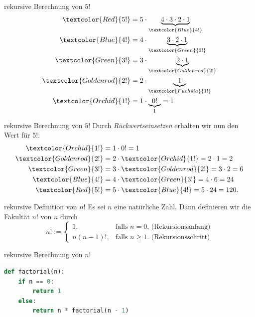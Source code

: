 \begin{frame}[fragile]{rekursive Berechnung von $5!$}
\begin{align*}
    \textcolor{Red}{5!} &= 5\cdot\underbrace{4\cdot 3\cdot 2\cdot 1}_{\textcolor{Blue}{4!}} \\
    \textcolor{Blue}{4!} &= 4\cdot\underbrace{3\cdot 2\cdot 1}_{\textcolor{Green}{3!}} \\
    \textcolor{Green}{3!} &= 3\cdot\underbrace{2\cdot 1}_{\textcolor{Goldenrod}{2!}} \\
    \textcolor{Goldenrod}{2!} &= 2\cdot\underbrace{1}_{\textcolor{Fuchsia}{1!}} \\
    \textcolor{Orchid}{1!} &= 1\cdot\underbrace{0!}_{1} = 1
\end{align*}
\end{frame}

\begin{frame}[fragile]{rekursive Berechnung von $5!$}
Durch \textit{Rückwertseinsetzen} erhalten wir nun den Wert für $5!$:
\begin{align*}
    \textcolor{Orchid}{1!} &= 1\cdot 0! = 1 \\
    \textcolor{Goldenrod}{2!} &= 2\cdot\textcolor{Orchid}{1!} = 2\cdot 1 = 2 \\
    \textcolor{Green}{3!} &= 3\cdot \textcolor{Goldenrod}{2!} = 3\cdot 2 = 6 \\
    \textcolor{Blue}{4!} &= 4\cdot\textcolor{Green}{3!} = 4\cdot 6 = 24 \\
    \textcolor{Red}{5!} &= 5\cdot\textcolor{Blue}{4!} = 5\cdot 24 = 120.
\end{align*}
\end{frame}

\begin{frame}[fragile]{rekursive Definition von $n!$}
Es sei $n$ eine natürliche Zahl. Dann definieren wir die Fakultät $n!$ von $n$ durch
\[
  n! := 
  \begin{cases}
    1, &\text{falls $n=0$, (Rekursionsanfang)} \\
    n(n-1)!, & \text{falls  $n\geq 1$. (Rekursionsschritt)}
  \end{cases}
\]
\end{frame}

\begin{frame}[fragile]{rekursive Berechnung von $n!$}
\begin{lstlisting}[language=Python]
def factorial(n):
    if n == 0:
        return 1
    else:
        return n * factorial(n - 1)
\end{lstlisting}
\end{frame}

